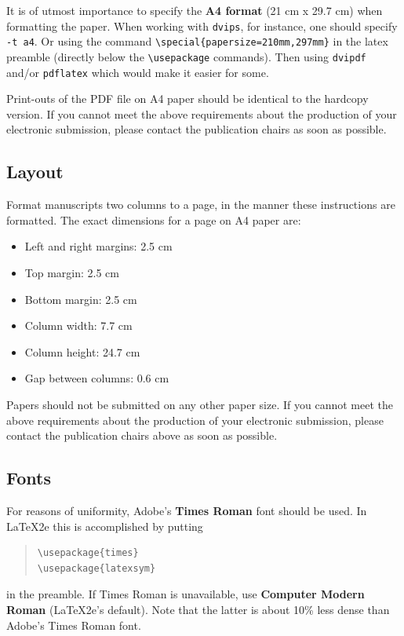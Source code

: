 \documentclass[11pt,a4paper]{article}
\begin{document}
It is of utmost importance to specify the \textbf{A4 format} (21 cm
x 29.7 cm) when formatting the paper. When working with
\texttt{dvips}, for instance, one should specify \texttt{-t a4}.
Or using the command \verb|\special{papersize=210mm,297mm}| in the latex
preamble (directly below the \verb|\usepackage| commands). Then using 
\texttt{dvipdf} and/or \texttt{pdflatex} which would make it easier for some.

Print-outs of the PDF file on A4 paper should be identical to the
hardcopy version. If you cannot meet the above requirements about the
production of your electronic submission, please contact the
publication chairs as soon as possible.

\subsection{Layout}
\label{ssec:layout}

Format manuscripts two columns to a page, in the manner these
instructions are formatted. The exact dimensions for a page on A4
paper are:

\begin{itemize}
\item Left and right margins: 2.5 cm
\item Top margin: 2.5 cm
\item Bottom margin: 2.5 cm
\item Column width: 7.7 cm
\item Column height: 24.7 cm
\item Gap between columns: 0.6 cm
\end{itemize}

\noindent Papers should not be submitted on any other paper size.
 If you cannot meet the above requirements about the production of 
 your electronic submission, please contact the publication chairs 
 above as soon as possible.

\subsection{Fonts}

For reasons of uniformity, Adobe's \textbf{Times Roman} font should be
used. In \LaTeX2e{} this is accomplished by putting

\begin{quote}
\begin{verbatim}
\usepackage{times}
\usepackage{latexsym}
\end{verbatim}
\end{quote}
in the preamble. If Times Roman is unavailable, use \textbf{Computer
  Modern Roman} (\LaTeX2e{}'s default).  Note that the latter is about
  10\% less dense than Adobe's Times Roman font.
\end{document}
